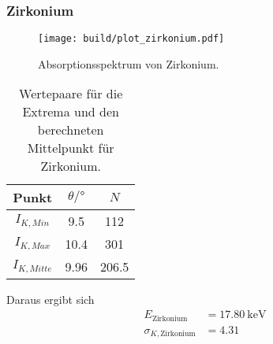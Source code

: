 \clearpage
\subsubsection*{Zirkonium}
\begin{figure}[H]
    \centering
    \texttt{[image: build/plot\_zirkonium.pdf]}
    \caption{Absorptionsspektrum von Zirkonium.}
    \label{fig:zirkonium}
\end{figure}
\begin{table}[H]                                                                                   
    \centering                                                                                     
        \caption{Wertepaare für die Extrema und den berechneten Mittelpunkt für Zirkonium.}                      
        \label{tab:Zr}                                                                        
        \begin{tabular}{S S[table-format=2.2] S}                                                   
          \toprule                                                                                 
          {Punkt} & {$\theta /\si{\degree}$} & {$N$}\\                                            
          \midrule                                                                                 
          {$I_{K,Min  }$} &9.5&112\\
          {$I_{K,Max  }$} &10.4&301\\
          {$I_{K,Mitte}$} &9.96&206.5\\
          \bottomrule                                                                              
        \end{tabular}                                                                              
      \end{table}                                                                                  
Daraus ergibt sich                                                                                 
\begin{align*}                                                                                     
    E_\text{Zirkonium} &= \SI{17.80}{\kilo\electronvolt}\\                  
    \sigma_{K, \text{Zirkonium}} &= \num{4.31}                      
\end{align*}                                                   